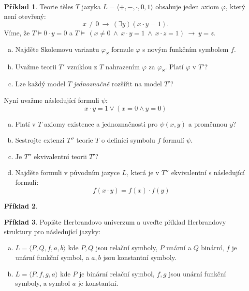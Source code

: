 \documentclass[a4paper]{article}
\theoremstyle{definition}
\newtheorem{problem}{Příklad}
\begin{document}
\medskip\begin{problem} %
Teorie těles $T$ jazyka $L=\langle +,-,\cdot,0,1\rangle$ obsahuje jeden axiom $\varphi$, který není otevřený:
$$
x\neq 0\ \to\ (\exists y)(x\cdot y=1).
$$    
Víme, že $T\models 0\cdot y=0$ a $T\models\ (x\ne 0\ \wedge\ x\cdot y=1\ \wedge\ x\cdot z=1)\ \to\ y=z$.
\begin{enumerate}[(a)]
    \item Najděte Skolemovu variantu $\varphi_S$ formule $\varphi$ s novým funkčním symbolem $f$.
    \item Uvažme teorii $T'$ vzniklou z $T$ nahrazením $\varphi$ za $\varphi_S$. Platí $\varphi$ v $T'$?
    \item Lze každý model $T$ \emph{jednoznačně} rozšířit na model $T'$?
\end{enumerate}
Nyní uvažme následující formuli $\psi$: 
$$
x\cdot y=1\vee  (x=0 \wedge y=0)
$$
\begin{enumerate}[(d)]
    \item Platí v $T$ axiomy existence a jednoznačnosti pro $\psi(x,y)$ a proměnnou $y$?
    \item Sestrojte extenzi $T''$ teorie $T$ o definici symbolu $f$ formulí $\psi$.
    \item Je $T''$ ekvivalentní teorii $T'$?
    \item Najděte formuli v původním jazyce $L$, která je v $T''$ ekvivalentní s následující formulí:
    $$
        f(x\cdot y)=f(x)\cdot f(y)
    $$
\end{enumerate}
\end{problem}


\medskip\begin{problem} 

\end{problem}


\medskip\begin{problem} Popište Herbrandovo univerzum a uveďte příklad Herbrandovy struktury pro následující jazyky:
\begin{enumerate}[(a)]
    \item $L=\langle P,Q,f,a,b \rangle$ kde  $P,Q$ jsou relační symboly, $P$ unární a $Q$ binární, $f$ je unární funkční symbol, a $a,b$ jsou konstantní symboly.
    \item $L=\langle P,f,g,a \rangle$ kde $P$ je binární relační symbol, $f,g$ jsou unární funkční symboly, a symbol $a$ je konstantní.
\end{enumerate}
\end{problem}
\end{document}
